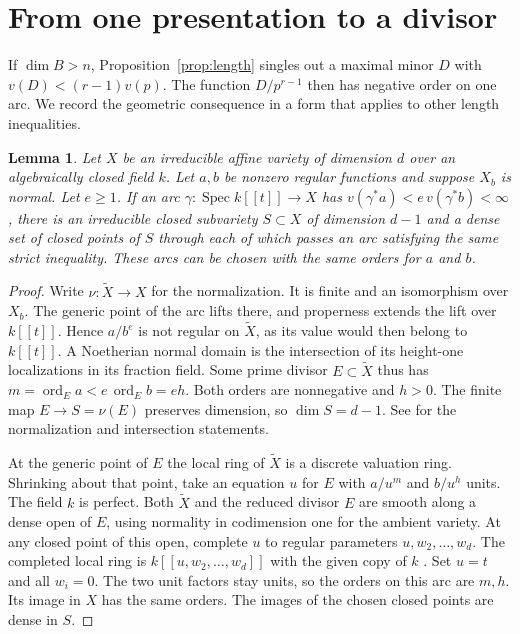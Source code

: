 \documentclass[11pt,reqno]{amsart}
\newtheorem{lemma}[theorem]{Lemma}
\theoremstyle{definition}
\newcommand{\ord}{\operatorname{ord}}
\begin{document}
\section{From one presentation to a divisor}\label{sec:divisor}
If \(\dim B>n\), Proposition~\ref{prop:length} singles out a maximal
minor \(D\) with \(v(D)<(r-1)v(p)\). The function \(D/p^{r-1}\) then
has negative order on one arc. We record the geometric consequence in
a form that applies to other length inequalities.

\begin{lemma}\label{lem:divisor}
Let \(X\) be an irreducible affine variety of dimension \(d\) over an
algebraically closed field \(k\). Let \(a,b\) be nonzero regular functions
and suppose \(X_b\) is normal. Let \(e\geq1\). If an arc
\(\gamma:\operatorname{Spec} k[[t]]\to X\) has
\(v(\gamma^*a)<e\,v(\gamma^*b)<\infty\), there is an irreducible closed
subvariety \(S\subset X\) of dimension \(d-1\) and a dense set of closed
points of \(S\) through each of which passes an arc satisfying the same
strict inequality. These arcs can be chosen with the same orders for
\(a\) and \(b\).
\end{lemma}
\begin{proof}
Write \(\nu:\widetilde X\to X\) for the normalization. It is finite
and an isomorphism over \(X_b\). The generic point of the arc lifts there,
and properness extends the lift over \(k[[t]]\). Hence \(a/b^e\) is not
regular on \(\widetilde X\), as its value would then belong to \(k[[t]]\).
A Noetherian normal domain is the intersection
of its height-one localizations in its fraction field. Some prime divisor
\(E\subset\widetilde X\) thus has
\(m=\ord_E a<e\,\ord_E b=e h\). Both orders are nonnegative and \(h>0\).
The finite map \(E\to S=\nu(E)\) preserves dimension, so \(\dim S=d-1\).
See \cite[Tags 0BXR and 031T]{Stacks} for the normalization and
intersection statements.

At the generic point of \(E\) the local ring of \(\widetilde X\) is a
discrete valuation ring. Shrinking about that point, take an equation
\(u\) for \(E\) with \(a/u^m\) and \(b/u^h\) units. The field \(k\) is
perfect. Both \(\widetilde X\) and the reduced divisor \(E\) are smooth
along a dense open of \(E\), using normality in codimension one for the
ambient variety. At any closed point of this open, complete \(u\) to
regular parameters \(u,w_2,\ldots,w_d\). The completed local ring is
\(k[[u,w_2,\ldots,w_d]]\) with the given copy of \(k\)
\cite[Tag 0C0S]{Stacks}. Set \(u=t\) and all \(w_i=0\). The two unit
factors stay units, so the orders on this arc are \(m,h\). Its image in
\(X\) has the same orders. The images of the chosen closed points are
dense in \(S\).
\end{proof}
\end{document}
